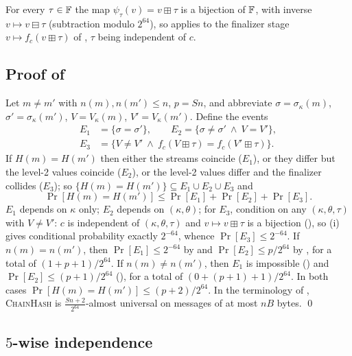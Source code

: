 \begin{corollary}\label{cor:ph:twist}
For every $\tau\in\mathbb{F}$ the map $\psi_\tau(v)=v\boxplus\tau$ is a bijection of
$\mathbb{F}$, with inverse $v\mapsto v\boxminus\tau$ (subtraction modulo $2^{64}$),
so  applies to the finalizer stage
$v\mapsto f_c(v\boxplus\tau)$ of , $\tau$ being independent
of $c$.
\end{corollary}

\subsection{Proof of \texorpdfstring{}{the collision bound}}

Let $m\ne m'$ with $n(m),n(m')\le n$, $p=Sn$, and abbreviate
$\sigma=\sigma_\kappa(m)$, $\sigma'=\sigma_\kappa(m')$, $V=V_\kappa(m)$, $V'=V_\kappa(m')$.
Define the events
\[
\begin{aligned}
  E_1&=\{\sigma=\sigma'\},\qquad
  E_2=\{\sigma\ne\sigma'\ \wedge\ V=V'\},\\
  E_3&=\{V\ne V'\ \wedge\ f_c(V\boxplus\tau)=f_c(V'\boxplus\tau)\}.
\end{aligned}
\]
If $H(m)=H(m')$ then either the streams coincide ($E_1$), or they differ but
the level-2 values coincide ($E_2$), or the level-2 values differ and the
finalizer collides ($E_3$); so $\{H(m)=H(m')\}\subseteq E_1\cup E_2\cup E_3$ and
\[
  \Pr[H(m)=H(m')]\le\Pr[E_1]+\Pr[E_2]+\Pr[E_3].
\]
$E_1$ depends on $\kappa$ only; $E_2$ depends on $(\kappa,\theta)$; for $E_3$,
condition on any $(\kappa,\theta,\tau)$ with $V\ne V'$: $c$ is independent of
$(\kappa,\theta,\tau)$ and $v\mapsto v\boxplus\tau$ is a bijection
(), so (i) gives conditional
probability exactly $2^{-64}$, whence $\Pr[E_3]\le2^{-64}$.
If $n(m)=n(m')$, then $\Pr[E_1]\le2^{-64}$ by  and
$\Pr[E_2]\le p/2^{64}$ by , for a total of
$(1+p+1)/2^{64}$.  If $n(m)\ne n(m')$, then $E_1$ is impossible
() and $\Pr[E_2]\le(p+1)/2^{64}$ (),
for a total of $(0+(p+1)+1)/2^{64}$.  In both cases
$\Pr[H(m)=H(m')]\le(p+2)/2^{64}$.  In the terminology of
, \textsc{ChainHash} is
$\frac{Sn+2}{2^{64}}$-almost universal on messages of at most $nB$ bytes. \qed

\subsection{\texorpdfstring{$5$}{5}-wise independence}

